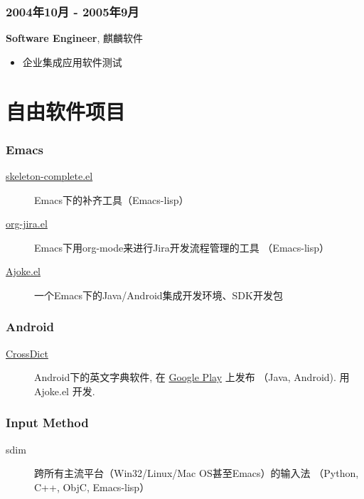 \documentclass[11pt,dvipdfmx,CJKbookmarks]{article}
\begin{document}
\begin{CJK*}{UTF8}{simsun}
\subsubsection{2004年10月 - 2005年9月}
\label{sec-1-0-6}
\textbf{Software Engineer}, 麒麟软件

\begin{itemize}
\item 企业集成应用软件测试
\end{itemize}

\section{自由软件项目}
\label{sec-2}

\subsubsection{Emacs}
\label{sec-2-0-1}

\begin{description}
\item[{\href{http://github.com/baohaojun/skeleton-complete}{skeleton-complete.el}}] Emacs下的补齐工具（Emacs-lisp）

\item[{\href{https://github.com/baohaojun/org-jira}{org-jira.el}}] Emacs下用org-mode来进行Jira开发流程管理的工具
（Emacs-lisp）

\item[{\href{https://github.com/baohaojun/ajoke}{Ajoke.el}}] 一个Emacs下的Java/Android集成开发环境、SDK开发包
\end{description}

\subsubsection{Android}
\label{sec-2-0-2}
\begin{description}
\item[{\href{https://github.com/baohaojun/BTAndroidWebViewSelection}{CrossDict}}] Android下的英文字典软件, 在 \href{https://play.google.com/store/apps/details?id=com.baohaojun.crossdict}{Google Play} 上发布
（Java, Android). 用 Ajoke.el 开发.
\end{description}

\subsubsection{Input Method}
\label{sec-2-0-3}
\begin{description}
\item[{sdim}] 跨所有主流平台（Win32/Linux/Mac OS甚至Emacs）的输入法
（Python, C++, ObjC, Emacs-lisp）


\end{description}
\end{CJK*}
\end{document}
